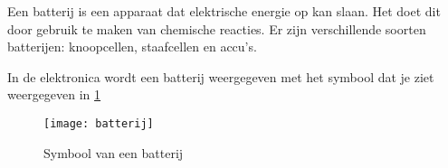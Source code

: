 Een batterij is een apparaat dat elektrische energie op kan slaan. Het doet dit door gebruik te maken van chemische reacties. Er zijn verschillende soorten batterijen: knoopcellen, staafcellen en accu's.

In de elektronica wordt een batterij weergegeven met het symbool dat je ziet weergegeven in \ref{symbool:battery}

\begin{figure}[h]
\texttt{[image: batterij]}
\centering
\caption{Symbool van een batterij}
\label{symbool:battery}
\end{figure}

